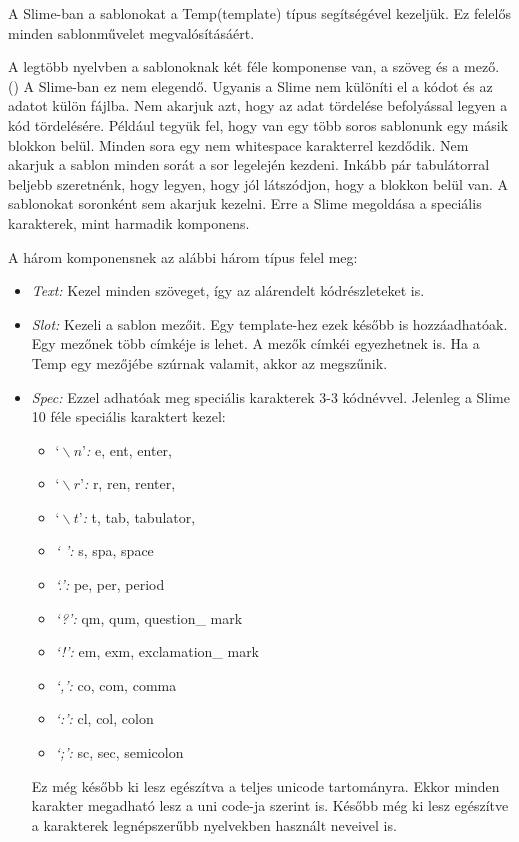 A Slime-ban a sablonokat a Temp(template) típus segítségével kezeljük. Ez felelős minden sablonművelet megvalósításáért.

A legtöbb nyelvben a sablonoknak két féle komponense van, a szöveg és a mező. ()
A Slime-ban ez nem elegendő.
Ugyanis a Slime nem különíti el a kódot és az adatot külön fájlba.
Nem akarjuk azt, hogy az adat tördelése befolyással legyen a kód tördelésére.
Például tegyük fel, hogy van egy több soros sablonunk egy másik blokkon belül.
Minden sora egy nem whitespace karakterrel kezdődik.
Nem akarjuk a sablon minden sorát a sor legelején kezdeni.
Inkább pár tabulátorral beljebb szeretnénk, hogy legyen, hogy jól látszódjon, hogy a blokkon belül van.
A sablonokat soronként sem akarjuk kezelni.
Erre a Slime megoldása a speciális karakterek, mint harmadik komponens.

A három komponensnek az alábbi három típus felel meg:
\begin{itemize}
\item \emph{Text:} 
Kezel minden szöveget, így az alárendelt kódrészleteket is.
\item \emph{Slot:} 
Kezeli a sablon mezőit.
Egy template-hez ezek később is hozzáadhatóak.
Egy mezőnek több címkéje is lehet.
A mezők címkéi egyezhetnek is.
Ha a Temp egy mezőjébe szúrnak valamit, akkor az megszűnik. 
\item \emph{Spec:} 
Ezzel adhatóak meg speciális karakterek 3-3 kódnévvel.
Jelenleg a Slime 10 féle speciális karaktert kezel:
\begin{itemize}
\item \emph{\textit{$‘\backslash n’$}:} e, ent, enter, 
\item \emph{\textit{$‘\backslash r’$}:} r, ren, renter, 
\item \emph{\textit{$‘\backslash t’$}:} t, tab, tabulator, 
\item \emph{\textit{‘ ’}:} s, spa, space 
\item \emph{\textit{‘.’}:} pe, per, period 
\item \emph{\textit{‘?’}:} qm, qum, question\_ mark 
\item \emph{\textit{‘!’}:} em, exm, exclamation\_ mark 
\item \emph{\textit{‘,’}:} co, com, comma
\item \emph{\textit{‘:’}:} cl, col, colon 
\item \emph{\textit{‘;’}:} sc, sec, semicolon
\end{itemize}
Ez még később ki lesz egészítva a teljes unicode tartományra. Ekkor minden karakter megadható lesz a uni code-ja szerint is.
Később még ki lesz egészítve a karakterek legnépszerűbb nyelvekben használt neveivel is.
\end{itemize}

